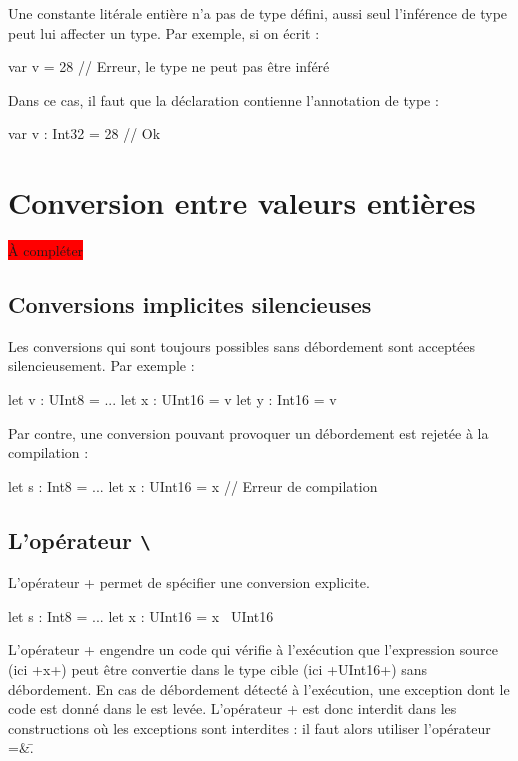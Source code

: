 Une constante litérale entière n'a pas de type défini, aussi seul l'inférence de type peut lui affecter un type. Par exemple, si on écrit :
\begin{PLM}
var v = 28 // Erreur, le type ne peut pas être inféré
\end{PLM}

Dans ce cas, il faut que la déclaration contienne l'annotation de type :
\begin{PLM}
var v : Int32 = 28 // Ok
\end{PLM}




\section{Conversion entre valeurs entières}

\colorbox{red}{À compléter}

\subsection{Conversions implicites silencieuses}
Les conversions qui sont toujours possibles sans débordement sont acceptées silencieusement. Par exemple :
\begin{PLM}
let v : UInt8 = ...
let x : UInt16 = v
let y : Int16 = v
\end{PLM}

Par contre, une conversion pouvant provoquer un débordement est rejetée à la compilation :
\begin{PLM}
let s : Int8 = ...
let x : UInt16 = x // Erreur de compilation
\end{PLM}

\subsection{L'opérateur \texttt{\textbackslash}}
L'opérateur \plm+\+ permet de spécifier une conversion explicite.

\begin{PLM}
let s : Int8 = ...
let x : UInt16 = x \ UInt16
\end{PLM}

L'opérateur \plm+\+ engendre un code qui vérifie à l'exécution que l'expression source (ici \plm+x+) peut être convertie dans le type cible (ici \plm+UInt16+) sans débordement. En cas de débordement détecté à l'exécution, une exception dont le code est donné dans le  est levée. L'opérateur \plm+\+ est donc interdit dans les constructions où les exceptions sont interdites : il faut alors utiliser l'opérateur \plm=&\=.


